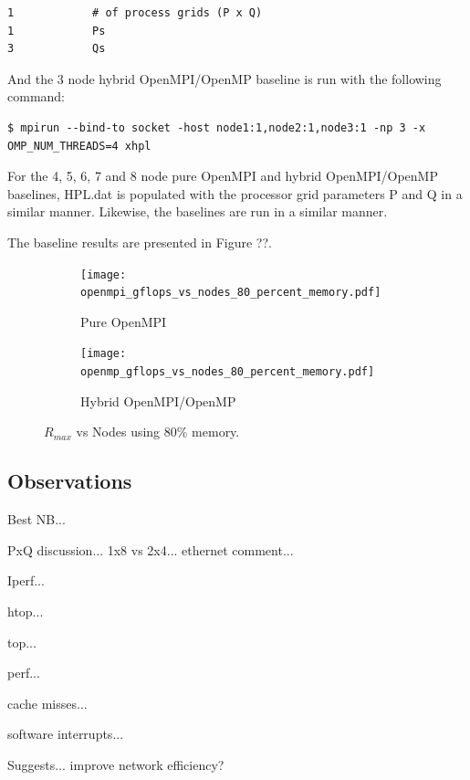 \documentclass{report}
\begin{document}
\lstset{style=listing}
\begin{lstlisting}[numbers=none]
1            # of process grids (P x Q)
1            Ps
3            Qs
\end{lstlisting}

And the 3 node hybrid OpenMPI/OpenMP baseline is run with the following command:

\lstset{style=type}
\begin{lstlisting}[]
$ mpirun --bind-to socket -host node1:1,node2:1,node3:1 -np 3 -x OMP_NUM_THREADS=4 xhpl
\end{lstlisting}

For the 4, 5, 6, 7 and 8 node pure OpenMPI and hybrid OpenMPI/OpenMP baselines, HPL.dat is populated with the processor grid parameters P and Q in a similar manner. Likewise, the baselines are run in a similar manner.

The baseline results are presented in Figure ??.

\begin{figure}[H]
	\begin{subfigure}{1.0\textwidth}
		\centering
		\texttt{[image: openmpi\_gflops\_vs\_nodes\_80\_percent\_memory.pdf]}
		\caption{Pure OpenMPI}
		\label{fig:subim1}
	\end{subfigure}
	\par\bigskip
	\begin{subfigure}{1.0\textwidth}
		\centering
		\texttt{[image: openmp\_gflops\_vs\_nodes\_80\_percent\_memory.pdf]}
		\caption{Hybrid OpenMPI/OpenMP}
		\label{fig:subim2}
	\end{subfigure}
\caption{$R_{max}$ vs Nodes using 80\% memory.}
\label{fig:image2}
\end{figure}


%
%
\subsection{Observations}

Best NB...

PxQ discussion... 1x8 vs 2x4... ethernet comment...

Iperf...

htop...

top...

perf...

cache misses...

software interrupts...

Suggests... improve network efficiency?
\end{document}
